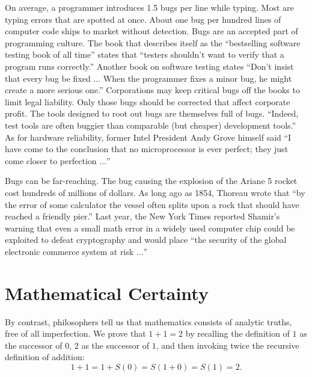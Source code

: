 \documentclass{llncs}
\begin{document}
  On average,
a programmer introduces 1.5 bugs per line while typing.
Most are typing errors that are spotted at once.
About one bug per hundred lines of computer code ships  to
market without detection.  Bugs are an accepted
part of programming culture.
The book that describes itself as the ``bestselling software testing
book of all time'' states that ``testers shouldn't want to verify
that a program runs correctly.'' 
Another book on software
testing states ``Don't insist that every bug be fixed $\ldots$
When the programmer fixes a minor bug, he might create
a more serious one.''  Corporations may keep critical bugs
off the books to
limit legal liability.
 Only those bugs should be corrected
that affect corporate profit.
The tools designed to root out bugs are themselves
full of bugs. ``Indeed, test tools are often buggier than
comparable (but cheaper) development tools.''
As for hardware reliability, former 
Intel President Andy Grove himself said 
``I have come to the conclusion that no microprocessor is ever
perfect; they just come closer to perfection $\ldots$''


Bugs can be far-reaching.
The bug causing the 
explosion of the Ariane 5 rocket cost hundreds of millions
of dollars.  As long ago as 1854, Thoreau wrote that 
``by the error of some calculator
the vessel often splits upon a rock that should have reached
a friendly pier.''  %
Last year, the New York Times reported Shamir's warning that
even a small math error in a widely used computer chip could 
be exploited to defeat cryptography and would
place
``the security of the global electronic commerce system at risk
$\ldots$''





\section{Mathematical Certainty}

By contrast, philosophers tell us that
mathematics consists of analytic truths,
free of all imperfection.  We prove that $1+1=2$ by
recalling the definition of $1$ as the successor of $0$,
$2$ as the successor of $1$, and then invoking twice the recursive
definition
of addition: 
  $$1+1 = 1 + S(0) = S(1 + 0) = S(1) = 2.$$
\end{document}
